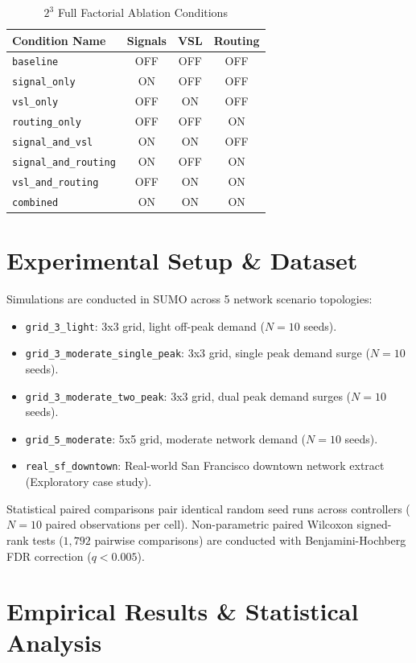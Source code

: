 \documentclass[journal,twocolumn]{IEEEtran}
\begin{document}
\begin{table}[htbp]
\centering
\caption{$2^3$ Full Factorial Ablation Conditions}
\label{tab:ablation_conditions}
\begin{tabular}{l c c c}
\hline
\textbf{Condition Name} & \textbf{Signals} & \textbf{VSL} & \textbf{Routing} \\
\hline
\texttt{baseline} & OFF & OFF & OFF \\
\texttt{signal\_only} & ON & OFF & OFF \\
\texttt{vsl\_only} & OFF & ON & OFF \\
\texttt{routing\_only} & OFF & OFF & ON \\
\texttt{signal\_and\_vsl} & ON & ON & OFF \\
\texttt{signal\_and\_routing} & ON & OFF & ON \\
\texttt{vsl\_and\_routing} & OFF & ON & ON \\
\texttt{combined} & ON & ON & ON \\
\hline
\end{tabular}
\end{table}

\section{Experimental Setup \& Dataset}
Simulations are conducted in SUMO across 5 network scenario topologies:
\begin{itemize}
    \item \texttt{grid\_3\_light}: 3x3 grid, light off-peak demand ($N=10$ seeds).
    \item \texttt{grid\_3\_moderate\_single\_peak}: 3x3 grid, single peak demand surge ($N=10$ seeds).
    \item \texttt{grid\_3\_moderate\_two\_peak}: 3x3 grid, dual peak demand surges ($N=10$ seeds).
    \item \texttt{grid\_5\_moderate}: 5x5 grid, moderate network demand ($N=10$ seeds).
    \item \texttt{real\_sf\_downtown}: Real-world San Francisco downtown network extract (Exploratory case study).
\end{itemize}

Statistical paired comparisons pair identical random seed runs across controllers ($N=10$ paired observations per cell). Non-parametric paired Wilcoxon signed-rank tests ($1,792$ pairwise comparisons) are conducted with Benjamini-Hochberg FDR correction ($q < 0.005$).

\section{Empirical Results \& Statistical Analysis}
\end{document}
